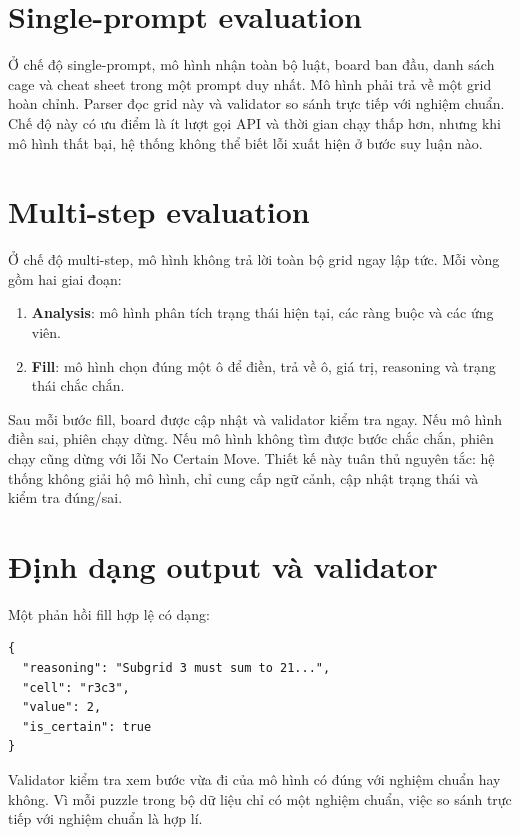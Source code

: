 \documentclass[12pt,a4paper,oneside]{report}
\newlength{\manualparindent}
\newcommand{\manualindent}{\hspace*{\manualparindent}}
\begin{document}
\section{Single-prompt evaluation}

\manualindent%
Ở chế độ single-prompt, mô hình nhận toàn bộ luật, board ban đầu, danh sách cage và cheat sheet trong một prompt duy nhất. Mô hình phải trả về một grid hoàn chỉnh. Parser đọc grid này và validator so sánh trực tiếp với nghiệm chuẩn. Chế độ này có ưu điểm là ít lượt gọi API và thời gian chạy thấp hơn, nhưng khi mô hình thất bại, hệ thống không thể biết lỗi xuất hiện ở bước suy luận nào.

\section{Multi-step evaluation}

Ở chế độ multi-step, mô hình không trả lời toàn bộ grid ngay lập tức. Mỗi vòng gồm hai giai đoạn:

\begin{enumerate}[label=\arabic*.]
  \item \textbf{Analysis}: mô hình phân tích trạng thái hiện tại, các ràng buộc và các ứng viên.
  \item \textbf{Fill}: mô hình chọn đúng một ô để điền, trả về ô, giá trị, reasoning và trạng thái chắc chắn.
\end{enumerate}

Sau mỗi bước fill, board được cập nhật và validator kiểm tra ngay. Nếu mô hình điền sai, phiên chạy dừng. Nếu mô hình không tìm được bước chắc chắn, phiên chạy cũng dừng với lỗi No Certain Move. Thiết kế này tuân thủ nguyên tắc: hệ thống không giải hộ mô hình, chỉ cung cấp ngữ cảnh, cập nhật trạng thái và kiểm tra đúng/sai.

\clearpage
\section{Định dạng output và validator}

Một phản hồi fill hợp lệ có dạng:

\begin{lstlisting}[style=promptstyle]
{
  "reasoning": "Subgrid 3 must sum to 21...",
  "cell": "r3c3",
  "value": 2,
  "is_certain": true
}
\end{lstlisting}

Validator kiểm tra xem bước vừa đi của mô hình có đúng với nghiệm chuẩn hay không. Vì mỗi puzzle trong bộ dữ liệu chỉ có một nghiệm chuẩn, việc so sánh trực tiếp với nghiệm chuẩn là hợp lí.
\end{document}
